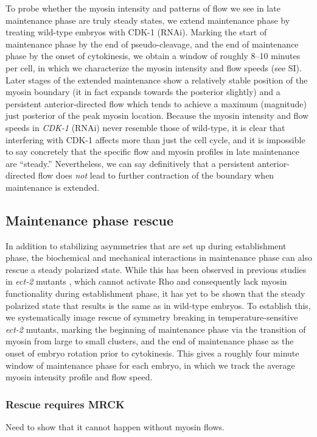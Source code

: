 \documentclass[11pt]{article}
\newcommand{\red}[1]{\color{red}#1\normalcolor}
\newcommand{\6}[1]{#1_{\text{6}}}
\newcommand{\3}[1]{#1_{\text{3}}}
\begin{document}
To probe whether the myosin intensity and patterns of flow we see in late maintenance phase are truly steady states, we extend maintenance phase by treating wild-type embryos with CDK-1 (RNAi). Marking the start of maintenance phase by the end of pseudo-cleavage, and the end of maintenance phase by the onset of cytokinesis, we obtain a window of roughly 8--10 minutes per cell, in which we characterize the myosin intensity and flow speeds (see SI). Later stages of the extended maintenance show a relatively stable position of the myosin boundary (it in fact expands towards the posterior slightly) and a persistent anterior-directed flow which tends to achieve a maximum (magnitude) just posterior of the peak myosin location. Because the myosin intensity and flow speeds in \emph{CDK-1} (RNAi) never resemble those of wild-type, it is clear that interfering with CDK-1 affects more than just the cell cycle, and it is impossible to say concretely that the specific flow and myosin profiles in late maintenance are ``steady.'' Nevertheless, we can say definitively that a persistent anterior-directed flow does \emph{not} lead to further contraction of the boundary when maintenance is extended.

\subsection{Maintenance phase rescue}
In addition to stabilizing asymmetries that are set up during establishment phase, the biochemical and mechanical interactions in maintenance phase can also rescue a steady polarized state. While this has been observed in previous studies  in \emph{ect-2} mutants \citep{zonies2010symmetry, tse2012rhoa}, which cannot activate Rho and consequently lack myosin functionality during establishment phase, it has yet to be shown that the steady polarized state that results is the same as in wild-type embryos. To establish this, we systematically image rescue of symmetry breaking in temperature-sensitive \emph{ect-2} mutants, marking the beginning of maintenance phase via the transition of myosin from large to small clusters, and the end of maintenance phase as the onset of embryo rotation prior to cytokinesis. This gives a roughly four minute window of maintenance phase for each embryo, in which we track the average myosin intensity profile and flow speed.


\subsubsection{Rescue requires MRCK}
\red{Need to show that it cannot happen without myosin flows.}
\end{document}
